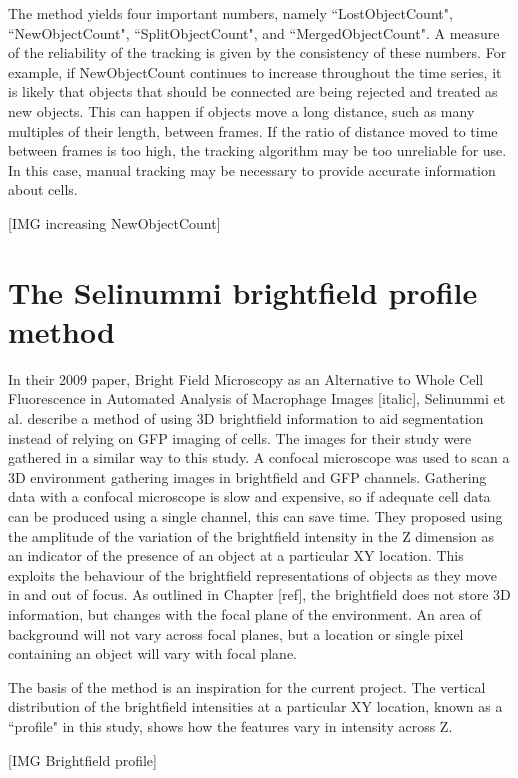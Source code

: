 The method yields four important numbers, namely ``LostObjectCount", ``NewObjectCount", ``SplitObjectCount", and ``MergedObjectCount". A measure of the reliability of the tracking is given by the consistency of these numbers. For example, if NewObjectCount continues to increase throughout the time series, it is likely that objects that should be connected are being rejected and treated as new objects. This can happen if objects move a long distance, such as many multiples of their length, between frames. If the ratio of distance moved to time between frames is too high, the tracking algorithm may be too unreliable for use. In this case, manual tracking may be necessary to provide accurate information about cells.

[IMG increasing NewObjectCount]

\section{The Selinummi brightfield profile method}

In their 2009 paper, Bright Field Microscopy as an Alternative to Whole Cell Fluorescence in Automated Analysis of Macrophage Images [italic], Selinummi et al. describe a method of using 3D brightfield information to aid segmentation instead of relying on GFP imaging of cells. The images for their study were gathered in a similar way to this study. A confocal microscope was used to scan a 3D environment gathering images in brightfield and GFP channels. Gathering data with a confocal microscope is slow and expensive, so if adequate cell data can be produced using a single channel, this can save time. They proposed using the amplitude of the variation of the brightfield intensity in the Z dimension as an indicator of the presence of an object at a particular XY location. This exploits the behaviour of the brightfield representations of objects as they move in and out of focus. As outlined in Chapter [ref], the brightfield does not store 3D information, but changes with the focal plane of the environment. An area of background will not vary across focal planes, but a location or single pixel containing an object will vary with focal plane.

The basis of the method is an inspiration for the current project. The vertical distribution of the brightfield intensities at a particular XY location, known as a ``profile" in this study, shows how the features vary in intensity across Z.

[IMG Brightfield profile]

